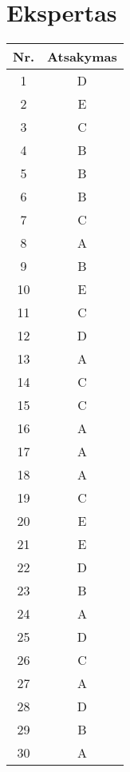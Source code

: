 \documentclass[12pt,a4paper,oneside]{book}
\begin{document}
\pagestyle{empty}
\chapter*{\centering Ekspertas}
\begin{center}
\vfill
\begin{tabular}[h]{c c}
Nr. & Atsakymas\\
\hline
1 & D\\
2 & E\\
3 & C\\
4 & B\\
5 & B\\
6 & B\\
7 & C\\
8 & A\\
9 & B\\
10 & E\\
11 & C\\
12 & D\\
13 & A\\
14 & C\\
15 & C\\
16 & A\\
17 & A\\
18 & A\\
19 & C\\
20 & E\\
21 & E\\
22 & D\\
23 & B\\
24 & A\\
25 & D\\
26 & C\\
27 & A\\
28 & D\\
29 & B\\
30 & A\\
\end{tabular}
\end{center}
\vfill
\end{document}
